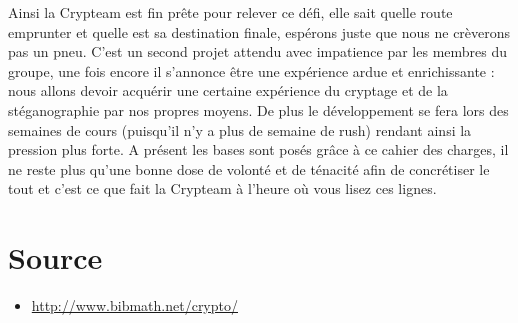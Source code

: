 \documentclass[a4paper,12pt]{article}
\begin{document}
Ainsi la Crypteam est fin prête pour relever ce défi, elle sait quelle route emprunter et quelle est sa destination finale, espérons juste que nous ne crèverons pas un pneu. C’est un second projet attendu avec impatience par les membres du groupe, une fois encore il s’annonce être une expérience ardue et enrichissante : nous allons devoir acquérir une certaine expérience du cryptage et de la stéganographie par nos propres moyens. De plus le développement se fera lors des semaines de cours (puisqu’il n’y a plus de semaine de rush) rendant ainsi la pression plus forte. A présent les bases sont posés grâce à ce cahier des charges, il ne reste plus qu’une bonne dose de volonté et de ténacité afin de concrétiser le tout et c’est ce que fait la Crypteam à l’heure où vous lisez ces lignes.

\newpage

\part*{Source}

\begin{itemize}
\item \href{http://www.bibmath.net/crypto/}{http://www.bibmath.net/crypto/}
\end{itemize}
\end{document}

